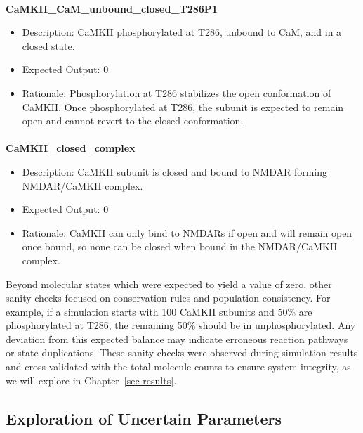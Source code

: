 \documentclass[
  11pt,
  letterpaper,
]{scrreprt}
\makeatletter
\let\oldparagraph\paragraph
\renewcommand{\paragraph}{
    \@ifstar
      \xxxParagraphStar
      \xxxParagraphNoStar
  }
\newcommand{\xxxParagraphStar}[1]{\oldparagraph*{#1}\mbox{}}
\newcommand{\xxxParagraphNoStar}[1]{\oldparagraph{#1}\mbox{}}
\providecommand{\tightlist}{%
  \setlength{\itemsep}{0pt}\setlength{\parskip}{0pt}}\usepackage{longtable,booktabs,array}
\makeatother
\begin{document}
\paragraph{\texorpdfstring{\textbf{CaMKII\_CaM\_unbound\_closed\_T286P1}}{CaMKII\_CaM\_unbound\_closed\_T286P1}}\label{camkii_cam_unbound_closed_t286p1}

\begin{itemize}
\tightlist
\item
  Description: CaMKII phosphorylated at T286, unbound to CaM, and in a
  closed state.
\item
  Expected Output: 0
\item
  Rationale: Phosphorylation at T286 stabilizes the open conformation of
  CaMKII. Once phosphorylated at T286, the subunit is expected to remain
  open and cannot revert to the closed conformation.
\end{itemize}

\paragraph{\texorpdfstring{\textbf{CaMKII\_closed\_complex}}{CaMKII\_closed\_complex}}\label{camkii_closed_complex}

\begin{itemize}
\tightlist
\item
  Description: CaMKII subunit is closed and bound to NMDAR forming
  NMDAR/CaMKII complex.
\item
  Expected Output: 0
\item
  Rationale: CaMKII can only bind to NMDARs if open and will remain open
  once bound, so none can be closed when bound in the NMDAR/CaMKII
  complex.
\end{itemize}

Beyond molecular states which were expected to yield a value of zero,
other sanity checks focused on conservation rules and population
consistency. For example, if a simulation starts with 100 CaMKII
subunits and 50\% are phosphorylated at T286, the remaining 50\% should
be in unphosphorylated. Any deviation from this expected balance may
indicate erroneous reaction pathways or state duplications. These sanity
checks were observed during simulation results and cross-validated with
the total molecule counts to ensure system integrity, as we will explore
in Chapter~\ref{sec-results}.

\subsection{Exploration of Uncertain
Parameters}\label{exploration-of-uncertain-parameters}
\end{document}
